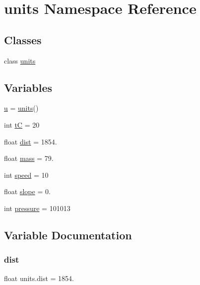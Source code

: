 \hypertarget{namespaceunits}{}\section{units Namespace Reference}
\label{namespaceunits}
\subsection*{Classes}
\begin{DoxyCompactItemize}
\item 
class \hyperlink{classunits_1_1units}{units}
\end{DoxyCompactItemize}
\subsection*{Variables}
\begin{DoxyCompactItemize}
\item 
\hyperlink{namespaceunits_a278004cb1c9566d5b92bae6dc0689bd2}{u} = \hyperlink{classunits_1_1units}{units}()
\item 
int \hyperlink{namespaceunits_a439934c05e3eda7647c77ae229719725}{tC} = 20
\item 
float \hyperlink{namespaceunits_ab66c7acd86085e0dd596e5835d5f020a}{dist} = 1854.
\item 
float \hyperlink{namespaceunits_a56758bcc2c4dd39571c297387d4a5a20}{mass} = 79.
\item 
int \hyperlink{namespaceunits_a759e0d0478b90aaac881c06441083170}{speed} = 10
\item 
float \hyperlink{namespaceunits_ab7d2af957359de3e2f6e43ecf93185c1}{slope} = 0.
\item 
int \hyperlink{namespaceunits_a445fabf5378ca3d0519a163ef4b0bdc7}{pressure} = 101013
\end{DoxyCompactItemize}


\subsection{Variable Documentation}
\mbox{\label{namespaceunits_ab66c7acd86085e0dd596e5835d5f020a}} 
\subsubsection{\texorpdfstring{dist}{dist}}
{\footnotesize\ttfamily float units.\+dist = 1854.}

